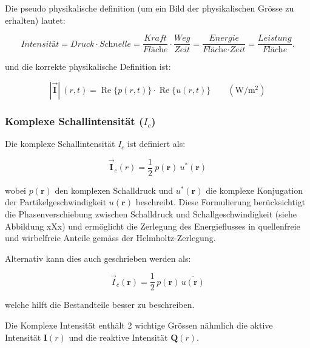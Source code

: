 Die pseudo physikalische definition (um ein Bild der physikalischen Grösse zu erhalten) lautet:

\begin{equation}
\textit{Intensität} = \textit{Druck} \cdot \textit{Schnelle}=\frac{\textit{Kraft}}{\textit{Fläche}} \cdot \frac{\textit{Weg}}{\textit{Zeit}} = \frac{\textit{Energie}}{\textit{Fläche}\cdot \textit{Zeit}} = \frac{\textit{Leistung}}{\textit{Fläche}}.
\label{helmholtz:equationIntensitaetPseudoDef}
\end{equation}

und die korrekte physikalische Definition ist:

\begin{equation}
\mathbf{|\vec{I}|} \:(r ,t)  =  \operatorname{Re} \{p(r, t)\} \cdot \operatorname{Re} \{u(r, t)\} \qquad (\si{\W / \square\metre})
\label{helmholtz:equationIntensitaetMomentan}
\end{equation}


\subsubsection{Komplexe Schallintensität ($I_c$)}

Die komplexe Schallintensität $I_c$ ist definiert als:

\begin{equation}
\mathbf{\vec{I}}_c (r)  = \frac{1}{2} \:  p(\mathbf{r}) \: u^{*}(\mathbf{r}) 
\label{helmholtz:equationIntensitaetKomplex}
\end{equation}

wobei $p(\mathbf{r})$ den komplexen Schalldruck und $u^{*}(\mathbf{r})$ die komplexe Konjugation der Partikelgeschwindigkeit $u(\mathbf{r})$ beschreibt. Diese Formulierung berücksichtigt die Phasenverschiebung zwischen Schalldruck und Schallgeschwindigkeit (siehe Abbildung xXx) und ermöglicht die Zerlegung des Energieflusses in quellenfreie und wirbelfreie Anteile gemäss der Helmholtz-Zerlegung.

Alternativ kann dies auch geschrieben werden als:

\begin{equation}
\vec{I}_c (\mathbf{r}) = \frac{1}{2} \, p(\mathbf{r}) \, \overline{u(\mathbf{r})}
\end{equation} 
 
welche hilft die Bestandteile besser zu beschreiben.

Die Komplexe Intensität enthält 2 wichtige Grössen nähmlich die aktive Intensität $\mathbf{I}(r)$ und die reaktive Intensität $\mathbf{Q}(r)$. 

